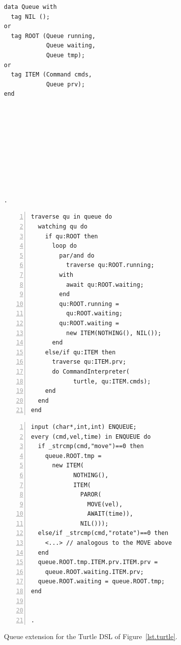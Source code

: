 \documentclass{sig-alternate}
\newcommand{\code}[1] {{\small{\texttt{#1}}}}
\begin{document}
\begin{figure}[t]
\begin{minipage}[t]{0.22\linewidth}
\begin{lstlisting}[title=CODE-3: \code{Queue} type]
data Queue with
  tag NIL ();
or
  tag ROOT (Queue running,
            Queue waiting,
            Queue tmp);
or
  tag ITEM (Command cmds,
            Queue prv);
end










.
\end{lstlisting}
\end{minipage}
%
\begin{minipage}[t]{0.36\linewidth}
\begin{lstlisting}[numbers=left,xleftmargin=3.5em,title=CODE-4: Queue traversal]
traverse qu in queue do
  watching qu do
    if qu:ROOT then
      loop do
        par/and do
          traverse qu:ROOT.running;
        with
          await qu:ROOT.waiting;
        end
        qu:ROOT.running =
          qu:ROOT.waiting;
        qu:ROOT.waiting =
          new ITEM(NOTHING(), NIL());
      end
    else/if qu:ITEM then
      traverse qu:ITEM.prv;
      do CommandInterpreter(
            turtle, qu:ITEM.cmds);
    end
  end
end
\end{lstlisting}
\end{minipage}
%
\begin{minipage}[t]{0.39\linewidth}
\begin{lstlisting}[numbers=left,xleftmargin=3.5em,title=CODE-5: Enqueuing commands]
input (char*,int,int) ENQUEUE;
every (cmd,vel,time) in ENQUEUE do
  if _strcmp(cmd,"move")==0 then
    queue.ROOT.tmp =
      new ITEM(
            NOTHING(),
            ITEM(
              PAROR(
                MOVE(vel),
                AWAIT(time)),
              NIL()));
  else/if _strcmp(cmd,"rotate")==0 then
    <...> // analogous to the MOVE above
  end
  queue.ROOT.tmp.ITEM.prv.ITEM.prv =
    queue.ROOT.waiting.ITEM.prv;
  queue.ROOT.waiting = queue.ROOT.tmp;
end


.
\end{lstlisting}
\end{minipage}
%
\caption{ Queue extension for the Turtle DSL of
          Figure~\ref{lst.turtle}.
\label{lst.turtle.queue}
}
\end{figure}
\end{document}
